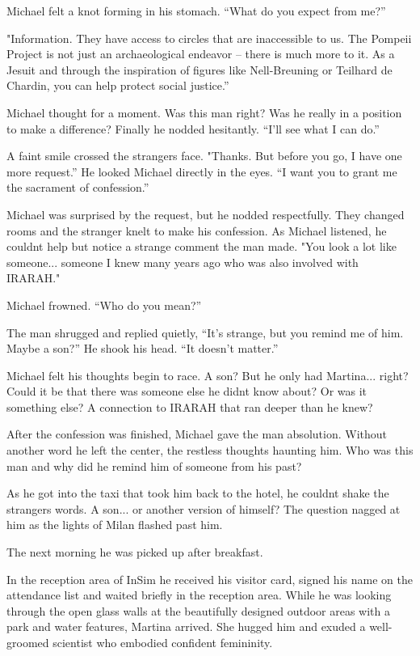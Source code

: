\documentclass[
]{article}
\begin{document}
Michael felt a knot forming in his stomach. ``What do you expect from
me?''

"Information. They have access to circles that are inaccessible to us.
The Pompeii Project is not just an archaeological endeavor -- there is
much more to it. As a Jesuit and through the inspiration of figures like
Nell-Breuning or Teilhard de Chardin, you can help protect social
justice.''

Michael thought for a moment. Was this man right? Was he really in a
position to make a difference? Finally he nodded hesitantly. ``I'll see
what I can do.''

A faint smile crossed the stranger\textquotesingle s face. "Thanks. But
before you go, I have one more request.'' He looked Michael directly in
the eyes. ``I want you to grant me the sacrament of confession.''

Michael was surprised by the request, but he nodded respectfully. They
changed rooms and the stranger knelt to make his confession. As Michael
listened, he couldn\textquotesingle t help but notice a strange comment
the man made. "You look a lot like someone... someone I knew many years
ago who was also involved with IRARAH."

Michael frowned. ``Who do you mean?''

The man shrugged and replied quietly, ``It's strange, but you remind me
of him. Maybe a son?'' He shook his head. ``It doesn't matter.''

Michael felt his thoughts begin to race. A son? But he only had
Martina... right? Could it be that there was someone else he
didn\textquotesingle t know about? Or was it something else? A
connection to IRARAH that ran deeper than he knew?

After the confession was finished, Michael gave the man absolution.
Without another word he left the center, the restless thoughts haunting
him. Who was this man and why did he remind him of someone from his
past?

As he got into the taxi that took him back to the hotel, he
couldn\textquotesingle t shake the stranger\textquotesingle s words. A
son... or another version of himself? The question nagged at him as the
lights of Milan flashed past him.

The next morning he was picked up after breakfast.

In the reception area of \hspace{0pt}\hspace{0pt}InSim he received his
visitor card, signed his name on the attendance list and waited briefly
in the reception area. While he was looking through the open glass walls
at the beautifully designed outdoor areas with a park and water
features, Martina arrived. She hugged him and exuded a well-groomed
scientist who embodied confident femininity.
\end{document}
